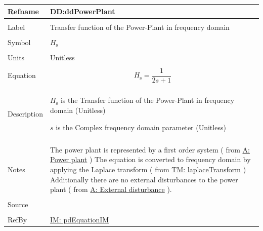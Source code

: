 \documentclass[12pt]{article}
\begin{document}
\vspace{\baselineskip}
\noindent
\begin{minipage}{\textwidth}
\begin{tabular}{>{\raggedright}p{}>{\raggedright\arraybackslash}p{}}
\toprule \textbf{Refname} & \textbf{DD:ddPowerPlant}
\label{DD:ddPowerPlant}
\\ \midrule \\
Label & Transfer function of the Power-Plant in frequency domain
        
\\ \midrule \\
Symbol & ${H_{\text{s}}}$
         
\\ \midrule \\
Units & Unitless
        
\\ \midrule \\
Equation & \begin{displaymath}
           {H_{\text{s}}}=\frac{1}{2 s+1}
           \end{displaymath}
\\ \midrule \\
Description & \begin{symbDescription}
              \item{${H_{\text{s}}}$ is the Transfer function of the Power-Plant in frequency domain (Unitless)}
              \item{$s$ is the Complex frequency domain parameter (Unitless)}
              \end{symbDescription}
\\ \midrule \\
Notes & The power plant is represented by a first order system ( from  \hyperref[pwrPlant]{A: Power plant} ) The equation is converted to frequency domain by applying the Laplace transform ( from \hyperref[TM:laplaceTransform]{TM: laplaceTransform} ) Additionally there are no external disturbances to the power plant ( from  \hyperref[externalDistub]{A: External disturbance} ).
        
\\ \midrule \\
Source & \cite{pidWiki}
         
\\ \midrule \\
RefBy & \hyperref[IM:pdEquationIM]{IM: pdEquationIM}
        
\\ \bottomrule
\end{tabular}
\end{minipage}
\end{document}
